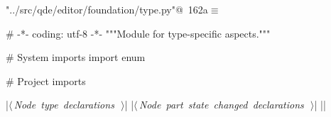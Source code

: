 \documentclass[%
    a4paper,    %
    justified,  %
    nobib,      %
    openany     %
]{tufte-book}
\begin{document}
\begin{flushleft} \small
\begin{minipage}{\linewidth}\label{scrap178}\raggedright\small
{} \verb@"../src/qde/editor/foundation/type.py"@\nobreak\ {\footnotesize {162a}}$\equiv$
\vspace{-1ex}
\begin{pythoncode}
# -*- coding: utf-8 -*-
"""Module for type-specific aspects."""

# System imports
import enum

# Project imports


|\hbox{$\langle\,${\itshape Node type declarations}\nobreak\ {\footnotesize {}}$\,\rangle$}|
|\hbox{$\langle\,${\itshape Node part state changed declarations}\nobreak\ {\footnotesize {}}$\,\rangle$}|
|\NWsep|
\end{pythoncode}
\vspace{1.5ex}
\footnotesize
\begin{list}{}{\setlength{\itemsep}{-\parsep}\setlength{\itemindent}{-\leftmargin}}

\item{}
\end{list}
\end{minipage}\vspace{4ex}
\end{flushleft}
\end{document}

